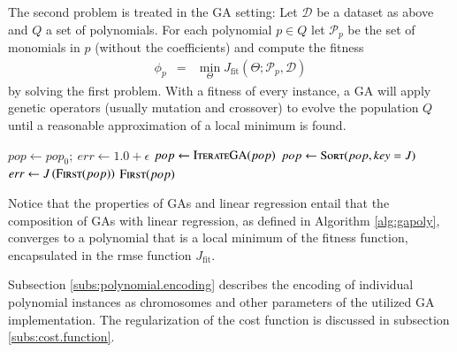 \documentclass[preprint,authoryear,12pt]{elsarticle}
\begin{document}
The second problem is treated in the \ac{GA} setting: Let $\mathcal{D}$ be a dataset as above and $Q$ a set of polynomials. For each polynomial $p\in Q$ let $\mathcal{P}_p$ be the set of monomials in $p$ (without the coefficients) and compute the fitness
%
\begin{eqnarray*}
\phi_p &=& \min_\Theta J_{\textrm{fit}}\left(\Theta;\mathcal{P}_p,\mathcal{D}\right)
\end{eqnarray*}
%
by solving the first problem. With a fitness of every instance, a \ac{GA} will apply genetic operators (usually mutation and crossover) to evolve the population $Q$ until a reasonable approximation of a local minimum is found. 
%
\begin{algorithm}[tb]
\begin{algorithmic}
	\State $pop \gets pop_0;\: err \gets 1.0+\epsilon$
		\State $pop \gets \Call{IterateGA}{pop}$
		\State $pop \gets \Call{Sort}{pop, key = J}$
		\State $err \gets J\left(\Call{First}{pop}\right)$
	\EndWhile
	\State\Return $\Call{First}{pop}$
\EndFunction
\end{algorithmic}
\caption{\ac{GAPoly} uses linear regression to find monomial coefficients that minimize the \ac{rmse} over a dataset and \acp{GA} to explore the space of polynomials. The role of the linear regression step is to produce a fitting error that sorts the population. At exit the \ac{rmse} of the fittest instance is bounded by $\epsilon$ or the maximum number of allowed iterations.}\label{alg:gapoly}
\end{algorithm} 
%
Notice that the properties of \acp{GA} and linear regression entail that
the composition of \acp{GA} with linear regression, as defined in Algorithm \ref{alg:gapoly}, converges to a polynomial that is a local minimum of the fitness function, encapsulated in the \ac{rmse} function $J_{\textrm{fit}}$.
%

%
Subsection \ref{subs:polynomial.encoding} describes the encoding of individual polynomial instances as chromosomes and other parameters of the utilized \ac{GA} implementation. The regularization of the cost function is discussed in subsection \ref{subs:cost.function}.

%
\end{document}

